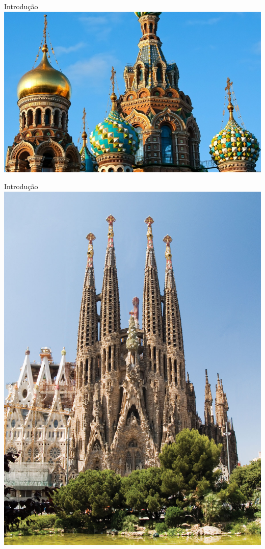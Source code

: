 \begin{frame}{Introdução}
	\centering
	\includegraphics[height=0.9\textheight]{Figuras/Ch07/fig1.4}
\end{frame}


\begin{frame}{Introdução}
	\centering
	\includegraphics[height=0.9\textheight]{Figuras/Ch07/fig1.5}
\end{frame}


